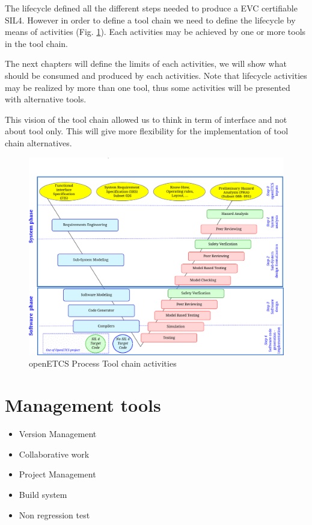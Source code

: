 The lifecycle defined all the different steps needed to produce a
\gls{EVC} certifiable SIL4. However in order to define a tool chain we
need to define the lifecycle by means of activities
(Fig. \ref{fig:openETCSActivities}). Each activities may be achieved by
one or more tools in the tool chain. 

The next chapters will define the limits of each activities, we will
show what should be consumed and produced by each activities. 
Note that lifecycle activities may be realized by more than one tool, thus some
activities will be presented with alternative tools.

This vision of the tool chain allowed us to think in term of interface
and not about tool only. This will give more flexibility for the
implementation of tool chain alternatives. 
\begin{figure}[htbp]
  \centering
  \includegraphics[width=\textwidth]{images/WholeProcess_Activities}
  \caption{openETCS Process Tool chain activities}
  \label{fig:openETCSActivities}
\end{figure}


\section{Management tools}
\begin{itemize}
\item Version Management
\item Collaborative work
\item Project  Management
\item Build system
\item Non regression test
\end{itemize}



